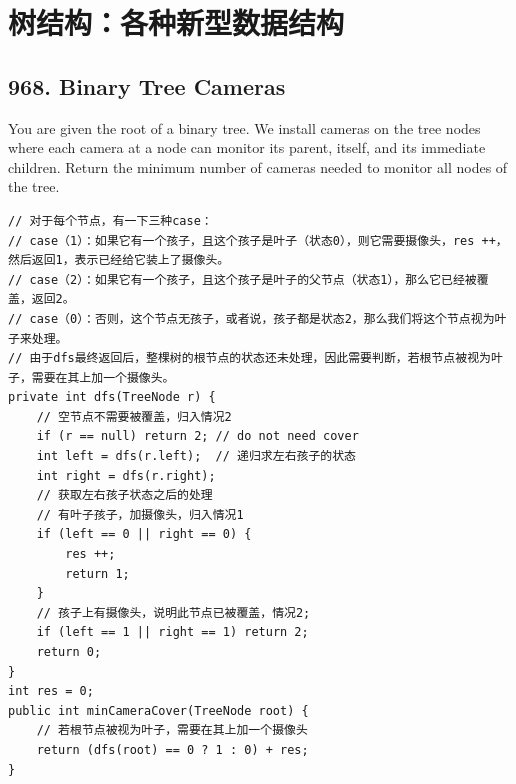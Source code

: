 \documentclass[9pt, b5paaper]{book}
\begin{document}
\chapter{树结构：各种新型数据结构}
\label{sec-8}

\section{968. Binary Tree Cameras}
\label{sec-8-1}
You are given the root of a binary tree. We install cameras on the tree nodes where each camera at a node can monitor its parent, itself, and its immediate children.
Return the minimum number of cameras needed to monitor all nodes of the tree.
\begin{verbatim}
// 对于每个节点，有一下三种case：
// case（1）：如果它有一个孩子，且这个孩子是叶子（状态0），则它需要摄像头，res ++，然后返回1，表示已经给它装上了摄像头。
// case（2）：如果它有一个孩子，且这个孩子是叶子的父节点（状态1），那么它已经被覆盖，返回2。
// case（0）：否则，这个节点无孩子，或者说，孩子都是状态2，那么我们将这个节点视为叶子来处理。
// 由于dfs最终返回后，整棵树的根节点的状态还未处理，因此需要判断，若根节点被视为叶子，需要在其上加一个摄像头。
private int dfs(TreeNode r) {
    // 空节点不需要被覆盖，归入情况2
    if (r == null) return 2; // do not need cover
    int left = dfs(r.left);  // 递归求左右孩子的状态
    int right = dfs(r.right);
    // 获取左右孩子状态之后的处理
    // 有叶子孩子，加摄像头，归入情况1
    if (left == 0 || right == 0) {
        res ++;
        return 1;
    }
    // 孩子上有摄像头，说明此节点已被覆盖，情况2; 
    if (left == 1 || right == 1) return 2;
    return 0;
}
int res = 0;
public int minCameraCover(TreeNode root) {
    // 若根节点被视为叶子，需要在其上加一个摄像头
    return (dfs(root) == 0 ? 1 : 0) + res;
}
\end{verbatim}
\end{document}
